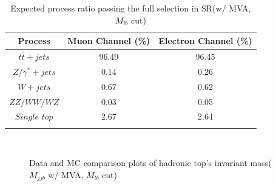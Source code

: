 		\begin{center}
		\begin{longtable}[H]{ c c c }
		\caption{Expected process ratio passing the full selection in SR(w/ MVA, $M_{lb}$ cut)}\\
		\hline
		 Process & Muon Channel (\%) & Electron Channel (\%) \\ 
		\hline
		 $t\bar{t}+jets$ & 96.49 & 96.45 \\
		 $Z/\gamma^{*}+jets$ & 0.14 &  0.26 \\
		 $W+jets$ & 0.67 & 0.62 \\
		 $ZZ/WW/WZ$ & 0.03 & 0.05 \\
		 $Single$ $top$ & 2.67 & 2.64 \\
		\hline
		\label{EventSelReco:tb:MC_process_a05_MLP_2C}
		\end{longtable}
		\end{center}
		\FloatBarrier

		\begin{figure}[H]
		\centering
			\\
		\caption{Data and MC comparison plots of hadronic top's invariant mass($M_{jjb}$ w/ MVA, $M_{lb}$ cut)}
		\label{EventSelReco:fig:a05_MLP_SR_2C_Mjjb}
		\end{figure}
		\FloatBarrier

